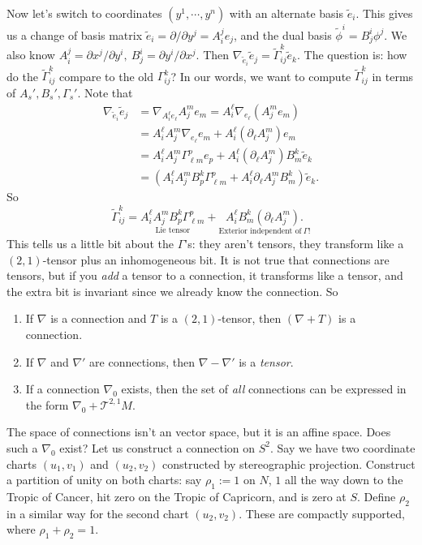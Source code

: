 Now let's switch to coordinates $(y^1,\cdots ,y^n )$ with an alternate basis $\widetilde e_i $. This gives us a change of basis matrix $\widetilde e_i =\partial /\partial y^j =A_i ^j e_j $, and the dual basis $\widetilde \phi^i =B^i _j \phi^j $. We also know $A_i ^j =\partial x^j /\partial y^i ,\ B^i _j =\partial y^i /\partial x^j $. Then $\nabla _{\widetilde e_i }\widetilde e_j =\widetilde \Gamma _{ij}^k \widetilde e_k.$ The question is: how do the $\widetilde \Gamma _{ij}^k$ compare to the old $\Gamma _{ij}^k$? In our words, we want to compute $\widetilde \Gamma _{ij}^k$ in terms of $A_s',B_s',\Gamma _s'$. Note that 
\begin{align*}
    \nabla _{\widetilde e_i }\widetilde e_j &= \nabla _{A_i ^{\ell}e_{\ell}}A_j ^me_m=A_i ^{\ell}\nabla _{e_{\ell}}(A_j ^me_m)\\
                                            &=A_i ^{\ell}A_j ^m\nabla _{e_{\ell} }e_m+A_i ^{\ell}(\partial _{\ell}A_j ^m)e_m\\
                                            &=A_i ^{\ell}A_j ^m\Gamma _{\ell m}^p e_p+A_i ^{\ell}(\partial _{\ell}A_j ^m)B_m^k \widetilde e_k\\
                                            &=(A_i ^{\ell}A_j ^mB_p^k \Gamma _{\ell m}^p+A_i ^{\ell}\partial _{\ell}A_j ^mB_m^k)\widetilde e_k.
\end{align*}So \[
\boxed{ \widetilde \Gamma _{ij}^k=\underset{\text{Lie tensor}}{A_i ^{\ell}A_j ^m B_p^k \Gamma _{\ell m}^p} + \underset{\text{Exterior independent of} \ \Gamma!}{A_i ^{\ell}B_m^k (\partial _{\ell}A_j ^m).}
} \] This tells us a little bit about the $\Gamma $'s: they aren't tensors, they transform like a $(2,1)$-tensor plus an inhomogeneous bit. It is not true that connections are tensors, but if you \emph{add} a tensor to a connection, it transforms like a tensor, and the extra bit is invariant since we already know the connection. So
\begin{enumerate}[label=(\arabic*)]
    \item If $\nabla$ is a connection and $T$ is a $(2,1)$-tensor, then $(\nabla+T)$ is a connection.
    \item If $\nabla$ and $\nabla'$ are connections, then $\nabla -\nabla '$ is a \emph{tensor}.
    \item If a connection $\nabla_0$ exists, then the set of \emph{all} connections can be expressed in the form $\nabla_0+\mathcal{T} ^{2,1}M.$
\end{enumerate}
The space of connections isn't an vector space, but it is an affine space. Does such a $\nabla_0$ exist? Let us construct a connection on $S^2$. Say we have two coordinate charts $(u_1,v_1)$ and $(u_2,v_2)$ constructed by stereographic projection. Construct a partition of unity on both charts: say $\rho_1:=1$ on $N$, $1$ all the way down to the Tropic of Cancer, hit zero on the Tropic of Capricorn, and is zero at $S$. Define $\rho_2$ in a similar way for the second chart $(u_2,v_2)$. These are compactly supported, where $\rho_1+\rho_2=1$.

